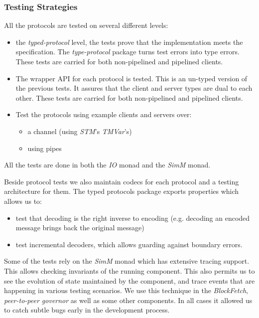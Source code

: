 \documentclass[11pt,a4paper]{article}
\begin{document}
\subsubsection{Testing Strategies}
\label{testing-strategies}

All the protocols are tested on several different levels:

\begin{itemize}
\item
  the \emph{typed-protocol} level, the tests prove that the
  implementation meets the specification. The \emph{type-protocol}
  package turns test errors into type errors. These tests are carried
  for both non-pipelined and pipelined clients.
\item
  The wrapper API for each protocol is tested. This is an un-typed
  version of the previous tests. It assures that the client and server
  types are dual to each other. These tests are carried for both
  non-pipelined and pipelined clients.
\item
  Test the protocols using example clients and servers over:

  \begin{itemize}
  \item
    a channel (using \emph{STM}'s \emph{TMVar}'s)
  \item
    using pipes
  \end{itemize}
\end{itemize}

All the tests are done in both the \emph{IO} monad and the \emph{SimM}
monad.

Beside protocol tests we also maintain codecs for each protocol and a
testing architecture for them. The typed protocols package exports
properties which allows us to:

\begin{itemize}
\item
  test that decoding is the right inverse to encoding (e.g. decoding an
  encoded message brings back the original message)
\item
  test incremental decoders, which allows guarding against boundary
  errors.
\end{itemize}

Some of the tests rely on the \emph{SimM} monad which has extensive
tracing support. This allows checking invariants of the running
component. This also permits us to see the evolution of state maintained
by the component, and trace events that are happening in various testing
scenarios. We use this technique in the \emph{BlockFetch},
\emph{peer-to-peer governor} as well as some other components. In all
cases it allowed us to catch subtle bugs early in the development
process.



\end{document}
